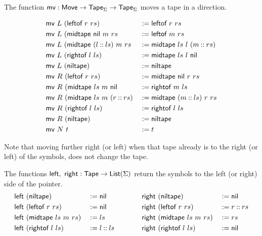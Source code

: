 The function $\textsf{mv} : \textsf{Move} \rightarrow \textsf{Tape}_\Sigma \rightarrow \textsf{Tape}_\Sigma$ moves a tape in a direction.
\begin{definition}
  \begin{alignat*}{2}
    & \textsf{mv}~L~(\textsf{leftof}~r~rs)              &&:= \textsf{leftof}~r~rs \\
    & \textsf{mv}~L~(\textsf{midtape}~\textsf{nil}~m~rs         &&:= \textsf{leftof}~m~rs \\
    & \textsf{mv}~L~(\textsf{midtape}~(l \mathbin{::} ls)~m~rs &&:= \textsf{midtape}~ls~l~(m \mathbin{::} rs) \\
    & \textsf{mv}~L~(\textsf{rightof}~l~ls)             &&:= \textsf{midtape}~ls~l~\textsf{nil} \\
    & \textsf{mv}~L~(\textsf{niltape})                  &&:= \textsf{niltape} \\
    & \textsf{mv}~R~(\textsf{leftof}~r~rs)              &&:= \textsf{midtape}~\textsf{nil}~r~rs \\
    & \textsf{mv}~R~(\textsf{midtape}~ls~m~\textsf{nil}         &&:= \textsf{rightof}~m~ls \\
    & \textsf{mv}~R~(\textsf{midtape}~ls~m~(r \mathbin{::} rs) &&:= \textsf{midtape}~(m \mathbin{::} ls)~r~rs \\
    & \textsf{mv}~R~(\textsf{rightof}~l~ls)             &&:= \textsf{rightof}~l~ls \\
    & \textsf{mv}~R~(\textsf{niltape})                  &&:= \textsf{niltape} \\
    & \textsf{mv}~N~t                               &&:= t
  \end{alignat*}
\end{definition}
Note that moving further right (or left) when that tape already is to the right (or left) of the symbols, does not change the tape.

The functions $\textsf{left},~\textsf{right} : \textsf{Tape} \rightarrow \textsf{List}(\Sigma)$ return the symbols to the left (or right) side of the pointer.
\begin{alignat*}{4}
  \textsf{left} &~(\textsf{niltape})                 &&:= \textsf{nil}
  \quad\quad\quad\quad
  & \textsf{right}&~(\textsf{niltape})               &&:= \textsf{nil} \\
  \textsf{left} &~(\textsf{leftof}~{r}~{rs})         &&:= \textsf{nil}
  & \textsf{right}&~(\textsf{leftof}~{r}~{rs})       &&:= r \mathbin{::} rs \\
  \textsf{left} &~(\textsf{midtape}~{ls}~{m}~{rs})   &&:= ls
  & \textsf{right}&~(\textsf{midtape}~{ls}~{m}~{rs}) &&:= rs \\
  \textsf{left} &~(\textsf{rightof}~{l}~{ls})        &&:= l \mathbin{::} ls
  & \textsf{right}&~(\textsf{rightof}~{l}~{ls})      &&:= \textsf{nil}
\end{alignat*}

